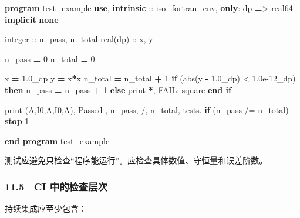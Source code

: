 \documentclass[
]{ctexbook}
\newenvironment{Shaded}{}{}
\newcommand{\BuiltInTok}[1]{#1}
\newcommand{\DataTypeTok}[1]{\textcolor[rgb]{0.56,0.13,0.00}{#1}}
\newcommand{\DecValTok}[1]{\textcolor[rgb]{0.25,0.63,0.44}{#1}}
\newcommand{\FloatTok}[1]{\textcolor[rgb]{0.25,0.63,0.44}{#1}}
\newcommand{\FunctionTok}[1]{\textcolor[rgb]{0.02,0.16,0.49}{#1}}
\newcommand{\KeywordTok}[1]{\textcolor[rgb]{0.00,0.44,0.13}{\textbf{#1}}}
\newcommand{\NormalTok}[1]{#1}
\newcommand{\OperatorTok}[1]{\textcolor[rgb]{0.40,0.40,0.40}{#1}}
\newcommand{\StringTok}[1]{\textcolor[rgb]{0.25,0.44,0.63}{#1}}
\begin{document}
\begin{Shaded}
\begin{Highlighting}[]
\KeywordTok{program}\NormalTok{ test\_example}
    \KeywordTok{use}\NormalTok{, }\KeywordTok{intrinsic} \DataTypeTok{::}\NormalTok{ iso\_fortran\_env, }\KeywordTok{only}\NormalTok{: dp }\KeywordTok{=}\OperatorTok{\textgreater{}}\NormalTok{ real64}
    \KeywordTok{implicit} \KeywordTok{none}

    \DataTypeTok{integer} \DataTypeTok{::}\NormalTok{ n\_pass, n\_total}
\DataTypeTok{    real(dp)} \DataTypeTok{::}\NormalTok{ x, y}

\NormalTok{    n\_pass }\KeywordTok{=} \DecValTok{0}
\NormalTok{    n\_total }\KeywordTok{=} \DecValTok{0}

\NormalTok{    x }\KeywordTok{=} \FloatTok{1.0\_dp}
\NormalTok{    y }\KeywordTok{=}\NormalTok{ x}\KeywordTok{*}\NormalTok{x}
\NormalTok{    n\_total }\KeywordTok{=}\NormalTok{ n\_total }\KeywordTok{+} \DecValTok{1}
    \KeywordTok{if}\NormalTok{ (}\BuiltInTok{abs}\NormalTok{(y }\KeywordTok{{-}} \FloatTok{1.0\_dp}\NormalTok{) }\OperatorTok{\textless{}} \FloatTok{1.0e{-}12\_dp}\NormalTok{) }\KeywordTok{then}
\NormalTok{        n\_pass }\KeywordTok{=}\NormalTok{ n\_pass }\KeywordTok{+} \DecValTok{1}
    \KeywordTok{else}
        \FunctionTok{print} \KeywordTok{*}\NormalTok{, }\StringTok{\textquotesingle{}FAIL: square\textquotesingle{}}
    \KeywordTok{end if}

    \FunctionTok{print} \StringTok{\textquotesingle{}(A,I0,A,I0,A)\textquotesingle{}}\NormalTok{, }\StringTok{\textquotesingle{}Passed \textquotesingle{}}\NormalTok{, n\_pass, }\StringTok{\textquotesingle{}/\textquotesingle{}}\NormalTok{, n\_total, }\StringTok{\textquotesingle{} tests.\textquotesingle{}}
    \KeywordTok{if}\NormalTok{ (n\_pass }\OperatorTok{/=}\NormalTok{ n\_total) }\KeywordTok{stop} \DecValTok{1}

\KeywordTok{end program}\NormalTok{ test\_example}
\end{Highlighting}
\end{Shaded}

测试应避免只检查``程序能运行''。应检查具体数值、守恒量和误差阶数。

\hypertarget{ci-ux4e2dux7684ux68c0ux67e5ux5c42ux6b21}{%
\subsubsection{11.5　CI
中的检查层次}\label{ci-ux4e2dux7684ux68c0ux67e5ux5c42ux6b21}}

持续集成应至少包含：
\end{document}
